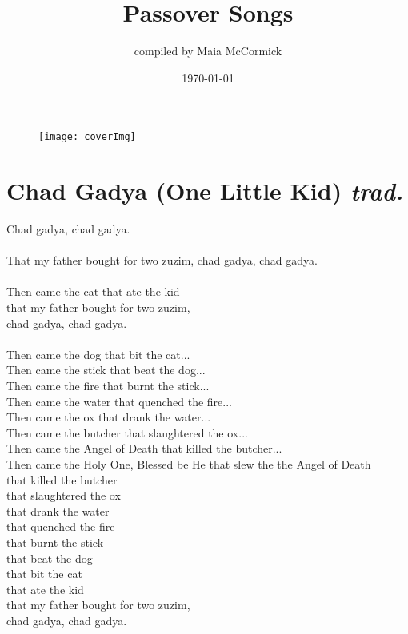 \documentclass[twoside,14pt,openany,letterpaper]{memoir}%
\title{Passover Songs}%
\author{compiled by Maia McCormick}%
\date{\today}%
\begin{document}
%
\normalsize%
\newcommand\song[2]{
  \chapter[#1 {\itshape#2}]{#1 \Large\itshape#2}
}
\newcommand\translation[1]{
	\vspace*{\fill}
	\large\textbf{TRANSLATION:\\}
	\normalsize\textit{#1}
}

%
\maketitle%

\begin{figure}[h]
\vspace{3.0cm}
\texttt{[image: coverImg]}
\centering
\end{figure}

\clearpage%
\tableofcontents%
\clearpage%
%


\song{Chad Gadya (One Little Kid)}{trad.}
Chad gadya, chad gadya.\\
\\
That my father bought for two zuzim, chad gadya, chad gadya.\\
\\
Then came the cat that ate the kid\\
that my father bought for two zuzim,\\
chad gadya, chad gadya.\\
\\
Then came the dog that bit the cat...\\
Then came the stick that beat the dog...\\
Then came the fire that burnt the stick...\\
Then came the water that quenched the fire...\\
Then came the ox that drank the water...\\
Then came the butcher that slaughtered the ox...\\
Then came the Angel of Death that killed the butcher...\\
Then came the Holy One, Blessed be He that slew the the Angel of Death\\
\indent that killed the butcher\\
\indent that slaughtered the ox\\
\indent that drank the water\\
\indent that quenched the fire\\
\indent that burnt the stick\\
\indent that beat the dog\\
\indent that bit the cat\\
\indent that ate the kid\\
\indent that my father bought for two zuzim,\\
\indent chad gadya, chad gadya.\\
\end{document}
